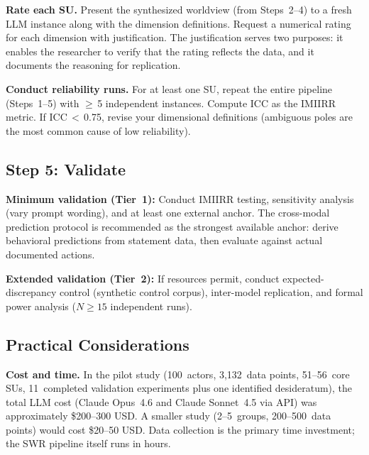 \documentclass[11pt,a4paper]{article}
\begin{document}
\textbf{Rate each SU.} Present the synthesized worldview (from Steps~2--4) to a fresh LLM instance along with the dimension definitions. Request a numerical rating for each dimension with justification. The justification serves two purposes: it enables the researcher to verify that the rating reflects the data, and it documents the reasoning for replication.

\textbf{Conduct reliability runs.} For at least one SU, repeat the entire pipeline (Steps~1--5) with $\geq$\,5 independent instances. Compute ICC as the IMIIRR metric. If ICC\,$<$\,0.75, revise your dimensional definitions (ambiguous poles are the most common cause of low reliability).

\subsection{Step 5: Validate}
\label{sec:app:step5}

\textbf{Minimum validation (Tier~1):} Conduct IMIIRR testing, sensitivity analysis (vary prompt wording), and at least one external anchor. The cross-modal prediction protocol is recommended as the strongest available anchor: derive behavioral predictions from statement data, then evaluate against actual documented actions.

\textbf{Extended validation (Tier~2):} If resources permit, conduct expected-discrepancy control (synthetic control corpus), inter-model replication, and formal power analysis ($N \geq 15$ independent runs).


\subsection{Practical Considerations}
\label{sec:app:practical}

\textbf{Cost and time.} In the pilot study (100~actors, 3,132~data points, 51--56~core SUs, 11~completed validation experiments plus one identified desideratum), the total LLM cost (Claude Opus~4.6 and Claude Sonnet~4.5 via API) was approximately \$200--300 USD. A smaller study (2--5~groups, 200--500~data points) would cost \$20--50 USD. Data collection is the primary time investment; the SWR pipeline itself runs in hours.
\end{document}

